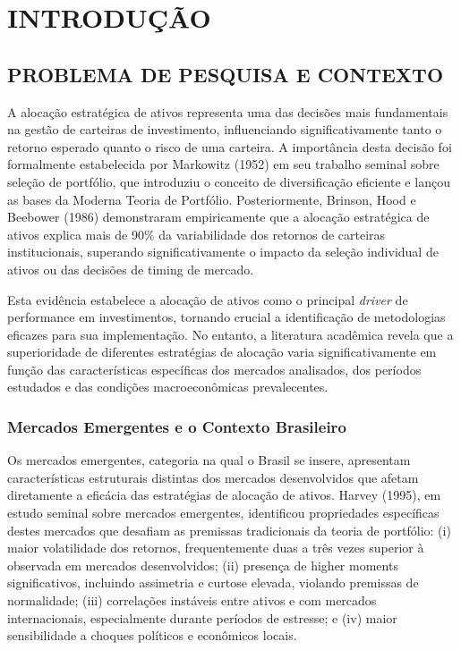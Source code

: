 
\pagestyle{fancy}

\chapter{INTRODUÇÃO}

\section{PROBLEMA DE PESQUISA E CONTEXTO}

A alocação estratégica de ativos representa uma das decisões mais fundamentais na gestão de carteiras de investimento, influenciando significativamente tanto o retorno esperado quanto o risco de uma carteira. A importância desta decisão foi formalmente estabelecida por Markowitz (1952) em seu trabalho seminal sobre seleção de portfólio, que introduziu o conceito de diversificação eficiente e lançou as bases da Moderna Teoria de Portfólio. Posteriormente, Brinson, Hood e Beebower (1986) demonstraram empiricamente que a alocação estratégica de ativos explica mais de 90\% da variabilidade dos retornos de carteiras institucionais, superando significativamente o impacto da seleção individual de ativos ou das decisões de timing de mercado.

Esta evidência estabelece a alocação de ativos como o principal \textit{driver} de performance em investimentos, tornando crucial a identificação de metodologias eficazes para sua implementação. No entanto, a literatura acadêmica revela que a superioridade de diferentes estratégias de alocação varia significativamente em função das características específicas dos mercados analisados, dos períodos estudados e das condições macroeconômicas prevalecentes.

\subsection{Mercados Emergentes e o Contexto Brasileiro}

Os mercados emergentes, categoria na qual o Brasil se insere, apresentam características estruturais distintas dos mercados desenvolvidos que afetam diretamente a eficácia das estratégias de alocação de ativos. Harvey (1995), em estudo seminal sobre mercados emergentes, identificou propriedades específicas destes mercados que desafiam as premissas tradicionais da teoria de portfólio: (i) maior volatilidade dos retornos, frequentemente duas a três vezes superior à observada em mercados desenvolvidos; (ii) presença de higher moments significativos, incluindo assimetria e curtose elevada, violando premissas de normalidade; (iii) correlações instáveis entre ativos e com mercados internacionais, especialmente durante períodos de estresse; e (iv) maior sensibilidade a choques políticos e econômicos locais.

